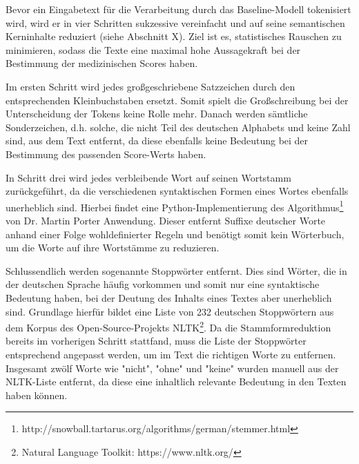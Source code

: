 Bevor ein Eingabetext für die Verarbeitung durch das Baseline-Modell tokenisiert wird, wird er in vier Schritten sukzessive vereinfacht und auf seine semantischen Kerninhalte reduziert (siehe Abschnitt X). Ziel ist es, statistisches Rauschen zu minimieren, sodass die Texte eine maximal hohe Aussagekraft bei der Bestimmung der medizinischen Scores haben.

Im ersten Schritt wird jedes großgeschriebene Satzzeichen durch den entsprechenden Kleinbuchstaben ersetzt. Somit spielt die Großschreibung bei der Unterscheidung der Tokens keine Rolle mehr. 
Danach werden sämtliche Sonderzeichen, d.h. solche, die nicht Teil des deutschen Alphabets und keine Zahl sind, aus dem Text entfernt, da diese ebenfalls keine Bedeutung bei der Bestimmung des passenden Score-Werts haben.

In Schritt drei wird jedes verbleibende Wort auf seinen Wortstamm zurückgeführt, da die verschiedenen syntaktischen Formen eines Wortes ebenfalls unerheblich sind. Hierbei findet eine Python-Implementierung des Algorithmus\footnote{http://snowball.tartarus.org/algorithms/german/stemmer.html} von Dr. Martin Porter Anwendung. Dieser entfernt Suffixe deutscher Worte anhand einer Folge wohldefinierter Regeln und benötigt somit kein Wörterbuch, um die Worte auf ihre Wortstämme zu reduzieren.

Schlussendlich werden sogenannte Stoppwörter entfernt. Dies sind Wörter, die in der deutschen Sprache häufig vorkommen und somit nur eine syntaktische Bedeutung haben, bei der Deutung des Inhalts eines Textes aber unerheblich sind. Grundlage hierfür bildet eine Liste von 232 deutschen Stoppwörtern aus dem Korpus des Open-Source-Projekts NLTK\footnote{Natural Language Toolkit: https://www.nltk.org/}. Da die Stammformreduktion bereits im vorherigen Schritt stattfand, muss die Liste der Stoppwörter entsprechend angepasst werden, um im Text die richtigen Worte zu entfernen. Insgesamt zwölf Worte wie "nicht", "ohne" und "keine" wurden manuell aus der NLTK-Liste entfernt, da diese eine inhaltlich relevante Bedeutung in den Texten haben können. 

